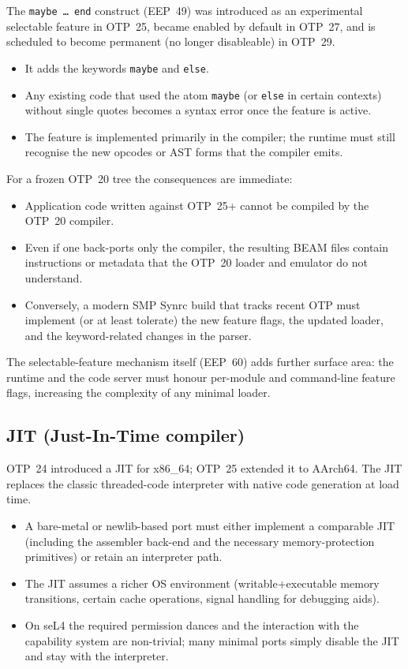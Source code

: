 \documentclass{article}
\begin{document}
The \texttt{maybe \ldots\ end} construct (EEP~49) was introduced as an experimental selectable feature in OTP~25, became enabled by default in OTP~27, and is scheduled to become permanent (no longer disableable) in OTP~29.

\begin{itemize}
  \item It adds the keywords \texttt{maybe} and \texttt{else}.
  \item Any existing code that used the atom \texttt{maybe} (or \texttt{else} in certain contexts) without single quotes becomes a syntax error once the feature is active.
  \item The feature is implemented primarily in the compiler; the runtime must still recognise the new opcodes or AST forms that the compiler emits.
\end{itemize}

For a frozen OTP~20 tree the consequences are immediate:

\begin{itemize}
  \item Application code written against OTP~25+ cannot be compiled by the OTP~20 compiler.
  \item Even if one back-ports only the compiler, the resulting BEAM files contain instructions or metadata that the OTP~20 loader and emulator do not understand.
  \item Conversely, a modern SMP Synrc build that tracks recent OTP must implement (or at least tolerate) the new feature flags, the updated loader, and the keyword-related changes in the parser.
\end{itemize}

The selectable-feature mechanism itself (EEP~60) adds further surface area: the runtime and the code server must honour per-module and command-line feature flags, increasing the complexity of any minimal loader.

\subsection{JIT (Just-In-Time compiler)}

OTP~24 introduced a JIT for x86\_64; OTP~25 extended it to AArch64.
The JIT replaces the classic threaded-code interpreter with native code generation at load time.

\begin{itemize}
  \item A bare-metal or newlib-based port must either implement a comparable JIT (including the assembler back-end and the necessary memory-protection primitives) or retain an interpreter path.
  \item The JIT assumes a richer OS environment (writable+executable memory transitions, certain cache operations, signal handling for debugging aids).
  \item On seL4 the required permission dances and the interaction with the capability system are non-trivial; many minimal ports simply disable the JIT and stay with the interpreter.
\end{itemize}
\end{document}
